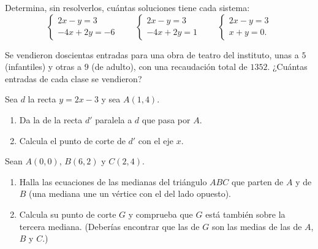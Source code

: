 \begin{exercise}[$\star\star$]\label{exo:g10:lines:7}
Determina, sin resolverlos, cuántas soluciones tiene cada sistema:
\[
\begin{cases}
2x - y = 3 \\
-4x + 2y = -6
\end{cases}
\qquad
\begin{cases}
2x - y = 3 \\
-4x + 2y = 1
\end{cases}
\qquad
\begin{cases}
2x - y = 3 \\
x + y = 0 .
\end{cases}
\]
\end{exercise}

\begin{exercise}[$\star\star$]\label{exo:g10:lines:8}
Se vendieron doscientas entradas para una obra de teatro del instituto,
unas a $5$ (infantiles) y otras a $9$ (de adulto), con una recaudación
total de $1352$. ¿Cuántas entradas de cada clase se vendieron?
\end{exercise}

\begin{exercise}[$\star\star$]\label{exo:g10:lines:9}
Sea $d$ la recta $y = 2x - 3$ y sea $A(1, 4)$.
\begin{enumerate}
  \item Da la  de la recta $d'$ paralela a $d$ que pasa por $A$.
  \item Calcula el punto de corte de $d'$ con el eje $x$.
\end{enumerate}
\end{exercise}

\begin{exercise}[$\star\star\star$]\label{exo:g10:lines:10}
Sean $A(0, 0)$, $B(6, 2)$ y $C(2, 4)$.
\begin{enumerate}
  \item Halla las ecuaciones de las medianas del triángulo $ABC$ que
        parten de $A$ y de $B$ (una mediana une un vértice con el  del lado opuesto).
  \item Calcula su punto de corte $G$ y comprueba que $G$ está también
        sobre la tercera mediana. (Deberías encontrar que las 
        de $G$ son las medias de las de $A$, $B$ y $C$.)
\end{enumerate}
\end{exercise}

